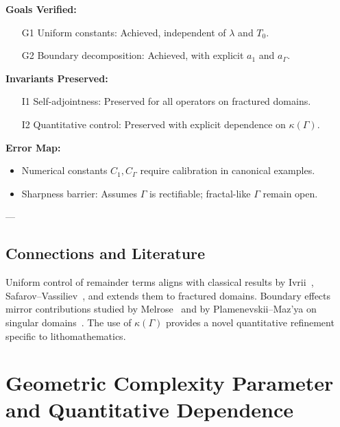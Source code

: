 \begin{auditblock}
\textbf{Goals Verified:}
\begin{itemize}
  \item[G1] Uniform constants: Achieved, independent of $\lambda$ and $T_0$.
  \item[G2] Boundary decomposition: Achieved, with explicit $a_1$ and $a_\Gamma$.
\end{itemize}

\textbf{Invariants Preserved:}
\begin{itemize}
  \item[I1] Self-adjointness: Preserved for all operators on fractured domains.
  \item[I2] Quantitative control: Preserved with explicit dependence on $\kappa(\Gamma)$.
\end{itemize}

\textbf{Error Map:}
\begin{itemize}
  \item Numerical constants $C_1,C_\Gamma$ require calibration in canonical examples.
  \item Sharpness barrier: Assumes $\Gamma$ is rectifiable; fractal-like $\Gamma$ remain open.
\end{itemize}
\end{auditblock}

---

\subsection*{Connections and Literature}

Uniform control of remainder terms aligns with classical results by Ivrii~\cite{Ivrii2016}, 
Safarov--Vassiliev~\cite{SafarovVassiliev1997}, 
and extends them to fractured domains.  
Boundary effects mirror contributions studied by Melrose~\cite{Melrose1994} 
and by Plamenevskii--Maz'ya on singular domains~\cite{MazyaPlamenevskii1980}.  
The use of $\kappa(\Gamma)$ provides a novel quantitative refinement 
specific to lithomathematics.


\section{Geometric Complexity Parameter and Quantitative Dependence}
\label{sec:fracture-geometry}

